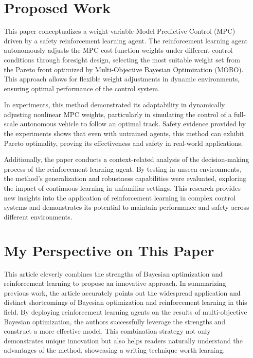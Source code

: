 \documentclass[9pt,a4paper,twocolumn,twoside]{tau-class/tau}
\begin{document}
\section{Proposed Work}
This paper conceptualizes a weight-variable Model Predictive Control (MPC) driven by a safety reinforcement learning agent. The reinforcement learning agent autonomously adjusts the MPC cost function weights under different control conditions through foresight design, selecting the most suitable weight set from the Pareto front optimized by Multi-Objective Bayesian Optimization (MOBO). This approach allows for flexible weight adjustments in dynamic environments, ensuring optimal performance of the control system.

In experiments, this method demonstrated its adaptability in dynamically adjusting nonlinear MPC weights, particularly in simulating the control of a full-scale autonomous vehicle to follow an optimal track. Safety evidence provided by the experiments shows that even with untrained agents, this method can exhibit Pareto optimality, proving its effectiveness and safety in real-world applications.

Additionally, the paper conducts a context-related analysis of the decision-making process of the reinforcement learning agent. By testing in unseen environments, the method's generalization and robustness capabilities were evaluated, exploring the impact of continuous learning in unfamiliar settings. This research provides new insights into the application of reinforcement learning in complex control systems and demonstrates its potential to maintain performance and safety across different environments.
    
\section{My Perspective on This Paper}
This article cleverly combines the strengths of Bayesian optimization and reinforcement learning to propose an innovative approach. In summarizing previous work, the article accurately points out the widespread application and distinct shortcomings of Bayesian optimization and reinforcement learning in this field. By deploying reinforcement learning agents on the results of multi-objective Bayesian optimization, the authors successfully leverage the strengths and construct a more effective model. This combination strategy not only demonstrates unique innovation but also helps readers naturally understand the advantages of the method, showcasing a writing technique worth learning.
\end{document}
